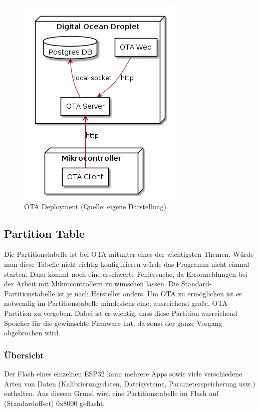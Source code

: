 \begin{figure}[H]
    \begin{center}
        \includegraphics[scale=0.6]{diagrams/ota_deployment.png}
        \caption{OTA Deployment (Quelle: eigene Darstellung)}
    \end{center}
\end{figure}

\subsection{Partition Table}\label{sec:ota-partition-table}
Die Partitionstabelle ist bei OTA mitunter eines der wichtigsten Themen. Würde man diese Tabelle nicht richtig konfigurieren würde das Programm nicht einmal starten. Dazu kommt noch eine erschwerte Fehlersuche, da Errormeldungen bei der Arbeit mit Mikrocontrollern zu wünschen lassen.
Die Standard-Partitionstabelle ist je nach Hersteller anders. Um OTA zu ermöglichen ist es notwendig im Partitionstabelle mindestens eine, ausreichend große, OTA-Partition zu vergeben. Dabei ist es wichtig, dass diese Partition ausreichend Speicher für die gewünschte Firmware hat, da sonst der ganze Vorgang abgebrochen wird.


\subsubsection{Übersicht}
Der Flash eines einzelnen ESP32 kann mehrere Apps sowie viele verschiedene Arten von Daten (Kalibrierungsdaten, Dateisysteme, Parameterspeicherung usw.) enthalten. Aus diesem Grund wird eine Partitionstabelle im Flash auf (Standardoffset) 0x8000 geflasht.

